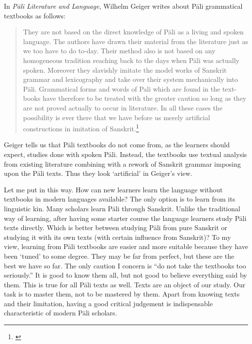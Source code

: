 In \emph{P\=ali Literature and Language}, Wilhelm Geiger writes about P\=ali grammatical textbooks as follows:

\begin{quote}
They are not based on the direct know­ledge of P\=ali as a living and spoken language. The authors have drawn their material from the literature just as we too have to do to-day. Their method also is not based on any homogeneous tradi­tion reaching back to the days when P\=ali was actually spoken. Moreover they slavishly imitate the model works of Sanskrit grammar and lexicography and take over their system mechanically into P\=ali. Grammatical forms and words of Pali which are found in the text-books have therefore to be treated with the greater caution so long as they are not proved actually to occur in literature. In all these cases the possibility is ever there that we have before us merely artificial constructions in imitation of Sanskrit.\footnote{\citealp[p.~50]{geiger:literature}} 
\end{quote}

Geiger tells us that P\=ali textbooks do not come from, as the learners should expect, studies done with spoken P\=ali. Instead, the textbooks use textual analysis from existing literature combining with a rework of Sanskrit grammar imposing upon the P\=ali texts. Thus they look `artificial' in Geiger's view.

Let me put in this way. How can new learners learn the language without textbooks in modern languages available? The only option is to learn from its linguistic kin. Many scholars learn P\=ali through Sanskrit. Unlike the traditional way of learning, after having some starter course the language learners study P\=ali texts directly. Which is better between studying P\=ali from pure Sanskrit or studying it with its own texts (with certain influence from Sanskrit)? To my view, learning from P\=ali textbooks are easier and more suitable because they have been `tuned' to some degree. They may be far from perfect, but these are the best we have so far. The only caution I concern is ``do not take the textbooks too seriously.'' It is good to know them all, but not good to believe everything said by them. This is true for all P\=ali texts as well. Texts are an object of our study. Our task is to master them, not to be mastered by them. Apart from knowing texts and their limitation, having a good critical judgement is indispensable characteristic of modern P\=ali scholars.
